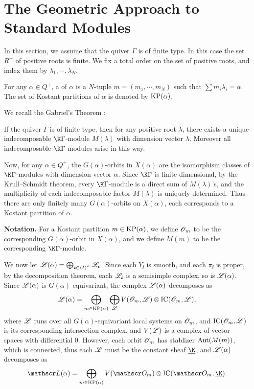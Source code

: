 \section{The Geometric Approach to Standard Modules}

In this section, we assume that the quiver $\Gamma$ is of finite type.
In this case the set $R^+$ of positive roots is finite. 
We fix a total order on the set of positive roots, and index them by $\lambda_1,\cdots,\lambda_N$.

\begin{definition}
    For any $\alpha\in Q^+$, a  of $\alpha$ is a $N$-tuple
    $m = (m_1,\cdots,m_N)$ such that $\sum m_i\lambda_i = \alpha$.
    The set of Kostant partitions of $\alpha$ is denoted by 
    $\operatorname{KP}(\alpha)$.
\end{definition}

We recall the Gabriel's Theorem \cite{G}:

\begin{theorem}\label{gabriel}
    If the quiver $\Gamma$ is of finite type, then for any 
    positive root $\lambda$, there exists a unique indecomposable
    $\K\Gamma$-module $M(\lambda)$ with dimension vector $\lambda$.
    Moreover all indecomposable $\K\Gamma$-modules arise in this way.
\end{theorem}

Now, for any $\alpha\in Q^+$, the $G(\alpha)$-orbits in $X(\alpha)$ are
the isomorphism classes of $\K\Gamma$-modules with dimension vector
$\alpha$. Since $\K\Gamma$ is finite dimensional, by the
Krull--Schmidt theorem, every $\K\Gamma$-module is a direct
sum of $M(\lambda)$'s, and the multiplicity
of each indecomposable factor $M(\lambda)$ is uniquely determined. 
Thus there are only finitely many $G(\alpha)$-orbits on $X(\alpha)$, each corresponds to
a Kostant partition of $\alpha$. 

\textbf{Notation.} For a Kostant partition $m\in\operatorname{KP}(\alpha)$,
we define $\mathscr{O}_m$ to be the corresponding $G(\alpha)$-orbit
in $X(\alpha)$, and we define $M(m)$ to be the corresponding
$\K\Gamma$-module.

We now let $\mathscr{L}(\alpha) = \bigoplus_{\boldsymbol{i}\in\left<I\right>^\alpha}
\mathscr{L}_{\boldsymbol{i}}$. Since each $Y_{\ii}$ is smooth, and each
$\pi_{\ii}$ is proper, by the decomposition theorem, 
each $\mathscr{L}_{\boldsymbol{i}}$ is a semisimple complex, so is 
$\mathscr{L}(\alpha)$. Since $\mathscr{L}(\alpha)$ is $G(\alpha)$-equivariant,
the complex $\mathscr{L}(\alpha)$ decomposes as $$\mathscr{L}(\alpha) = \bigoplus_{m\in\operatorname{KP}(\alpha)}
\bigoplus_{\mathscr{L}}V(\mathscr{O}_m,\mathscr{L})\otimes\mathrm{IC}(\mathscr{O}_m,\mathscr{L}),$$ where $\mathscr{L}$
runs over all $G(\alpha)$-equivariant local systems on $\mathscr{O}_m$, and $\mathrm{IC}(\mathscr{O}_m,\mathscr{L})$
is its corresponding intersection complex, and $V(\mathscr{L})$
is a complex of vector spaces with differential $0$.
However, each orbit $\mathscr{O}_m$ has stablizer $\operatorname{Aut}(M(m))$,
which is connected, thus each $\mathscr{L}$ must be the constant
sheaf $\underline{\K}$, and $\mathscr{L}(\alpha)$ decomposes as
\[
    \LL(\alpha) = \bigoplus_{m\in\KP(\alpha)}
    V(\OO_m)\ox\IC(\OO_m,\underline{\K}).
\]    

